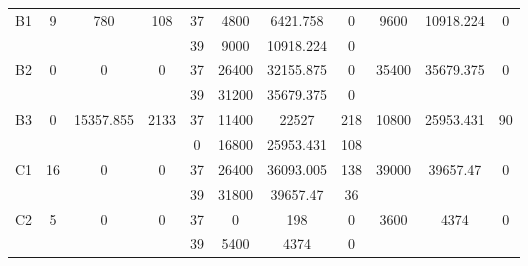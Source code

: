\begin{sidewaystable}
\begin{tabular}{c||c|c|c||c|c|c|c||c|c|c}
         &
        
      \\
      \hline
      \multirow{2}{*}{B1} &
      \multirow{2}{*}{9} &
      \multirow{2}{*}{780} &
      \multirow{2}{*}{108} &
      37 &
      4800 &
        6421.758 &
        0 &
      \multirow{2}{*}{9600} &
        \multirow{2}{*}{10918.224} &
        \multirow{2}{*}{0}
      \\
      \cline{5-8}
       &
       &
       &
       &
      39 &
      9000 &
        10918.224 &
        0 &
      
         &
        
      \\
      \hline
      \multirow{2}{*}{B2} &
      \multirow{2}{*}{0} &
      \multirow{2}{*}{0} &
      \multirow{2}{*}{0} &
      37 &
      26400 &
        32155.875 &
        0 &
      \multirow{2}{*}{35400} &
        \multirow{2}{*}{35679.375} &
        \multirow{2}{*}{0}
      \\
      \cline{5-8}
       &
       &
       &
       &
      39 &
      31200 &
        35679.375 &
        0 &
      
         &
        
      \\
      \hline
      \multirow{2}{*}{B3} &
      \multirow{2}{*}{0} &
      \multirow{2}{*}{15357.855} &
      \multirow{2}{*}{2133} &
      37 &
      11400 &
        22527 &
        218 &
      \multirow{2}{*}{10800} &
        \multirow{2}{*}{25953.431} &
        \multirow{2}{*}{90}
      \\
      \cline{5-8}
       &
       &
       &
       &
      0 &
      16800 &
        25953.431 &
        108 &
      
         &
        
      \\
      \hline
      \multirow{2}{*}{C1} &
      \multirow{2}{*}{16} &
      \multirow{2}{*}{0} &
      \multirow{2}{*}{0} &
      37 &
      26400 &
        36093.005 &
        138 &
      \multirow{2}{*}{39000} &
        \multirow{2}{*}{39657.47} &
        \multirow{2}{*}{0}
      \\
      \cline{5-8}
       &
       &
       &
       &
      39 &
      31800 &
        39657.47 &
        36 &
      
         &
        
      \\
      \hline
      \multirow{2}{*}{C2} &
      \multirow{2}{*}{5} &
      \multirow{2}{*}{0} &
      \multirow{2}{*}{0} &
      37 &
      0 &
        198 &
        0 &
      \multirow{2}{*}{3600} &
        \multirow{2}{*}{4374} &
        \multirow{2}{*}{0}
      \\
      \cline{5-8}
       &
       &
       &
       &
      39 &
      5400 &
        4374 &
        0 &
      

\end{tabular}
\end{sidewaystable}

